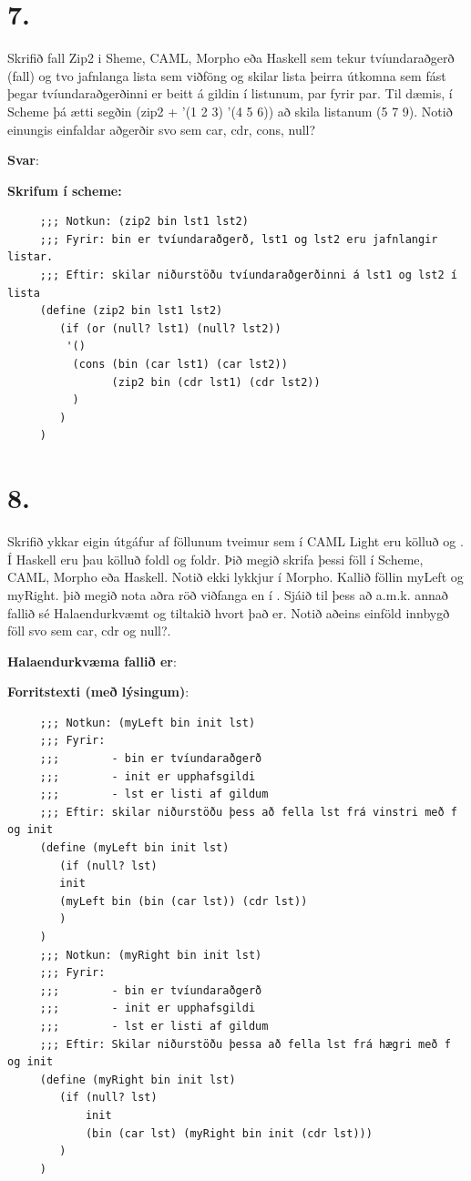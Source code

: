 \documentclass{article}
\newcommand{\bo}[1]{\textbf{#1}}
\begin{document}
     \newpage 

     \section{7.}

     Skrifið fall Zip2 i Sheme, CAML, Morpho eða Haskell sem tekur 
     tvíundaraðgerð (fall) og tvo jafnlanga lista sem viðföng og skilar lista þeirra útkomna sem fást þegar tvíundaraðgerðinni er beitt á
     gildin í listunum, par fyrir par. Til dæmis, í Scheme þá ætti segðin
     (zip2 + '(1 2 3) '(4 5 6)) að skila listanum (5 7 9). Notið einungis
     einfaldar aðgerðir svo sem car, cdr, cons, null?

     \textbf{Svar}:

     \bo{Skrifum í scheme:}

     \begin{lstlisting}
     ;;; Notkun: (zip2 bin lst1 lst2)
     ;;; Fyrir: bin er tvíundaraðgerð, lst1 og lst2 eru jafnlangir listar.
     ;;; Eftir: skilar niðurstöðu tvíundaraðgerðinni á lst1 og lst2 í lista
     (define (zip2 bin lst1 lst2)
        (if (or (null? lst1) (null? lst2))
         '()
          (cons (bin (car lst1) (car lst2))
                (zip2 bin (cdr lst1) (cdr lst2))
          )
        )
     )
     \end{lstlisting}


     \newpage
     \section{8.}
     Skrifið ykkar eigin útgáfur af föllunum tveimur sem í CAML Light 
     eru kölluð  og . Í Haskell eru þau kölluð foldl og foldr. 
     Þið megið skrifa þessi föll í Scheme, CAML, Morpho eða Haskell. Notið
     ekki lykkjur í Morpho. Kallið föllin myLeft og myRight. þið megið nota aðra röð viðfanga en í . Sjáið til þess að a.m.k.
     annað fallið sé Halaendurkvæmt og tiltakið hvort það er. Notið 
     aðeins einföld innbygð föll svo sem car, cdr og null?.


     \textbf{Halaendurkvæma fallið er}:


     \textbf{Forritstexti (með lýsingum)}:

     \begin{lstlisting}
     ;;; Notkun: (myLeft bin init lst)
     ;;; Fyrir: 
     ;;;        - bin er tvíundaraðgerð
     ;;;        - init er upphafsgildi
     ;;;        - lst er listi af gildum
     ;;; Eftir: skilar niðurstöðu þess að fella lst frá vinstri með f og init
     (define (myLeft bin init lst)
        (if (null? lst)
        init
        (myLeft bin (bin (car lst)) (cdr lst))
        )
     )
     ;;; Notkun: (myRight bin init lst)
     ;;; Fyrir: 
     ;;;        - bin er tvíundaraðgerð
     ;;;        - init er upphafsgildi
     ;;;        - lst er listi af gildum
     ;;; Eftir: Skilar niðurstöðu þessa að fella lst frá hægri með f og init
     (define (myRight bin init lst)
        (if (null? lst)
            init
            (bin (car lst) (myRight bin init (cdr lst)))
        )   
     )
     \end{lstlisting}
\end{document}
